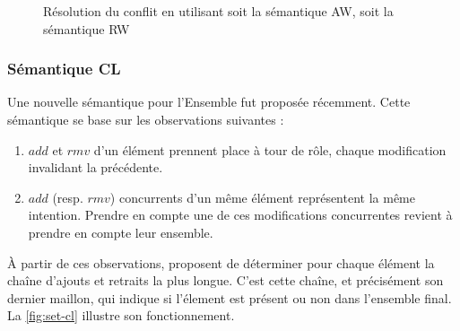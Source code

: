 \documentclass[12pt]{thesul}
\newcommand{\trm}[1]{\mathit{#1}}
\begin{document}
\begin{figure}[!ht]
{\begin{minipage}{\columnwidth}
{
          \label{fig:set-rw}}
      \end{minipage}}
  \caption{Résolution du conflit en utilisant soit la sémantique \ac{AW}, soit la sémantique \ac{RW}}
  \label{fig:set-aw-rw}
\end{figure}

\subsubsection{Sémantique \acl{CL}}

Une nouvelle sémantique pour l'Ensemble fut proposée \cite{2020-cl-set-weihai} récemment.
Cette sémantique se base sur les observations suivantes :

\begin{enumerate}[label=(\roman*)]
  \item $\trm{add}$ et $\trm{rmv}$ d'un élément prennent place à tour de rôle, chaque modification invalidant la précédente.
  \item $\trm{add}$ (resp. $\trm{rmv}$) concurrents d'un même élément représentent la même intention.
    Prendre en compte une de ces modifications concurrentes revient à prendre en compte leur ensemble.
\end{enumerate}

À partir de ces observations, \citeauthor{2020-cl-set-weihai} proposent de déterminer pour chaque élément la chaîne d'ajouts et retraits la plus longue.
C'est cette chaîne, et précisément son dernier maillon, qui indique si l'élement est présent ou non dans l'ensemble final.
La \autoref{fig:set-cl} illustre son fonctionnement.
\end{document}
